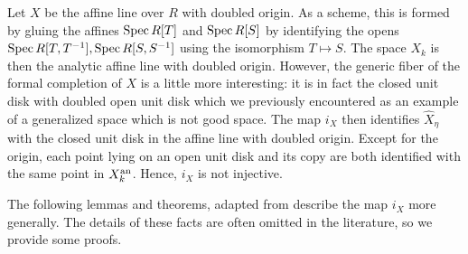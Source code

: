 \begin{example}
    Let $X$ be the affine line over $R$ with doubled origin. 
    As a scheme, this is formed by gluing the affines $\operatorname{Spec} R[T]$ and $\operatorname{Spec} R[S]$ by identifying the opens $\operatorname{Spec} R[T, T^{-1}], \operatorname{Spec} R[S, S^{-1}]$ using the isomorphism $T \mapsto S$. The space $X_k$ is then the analytic affine line with doubled origin. 
    However, the generic fiber of the formal completion of $X$ is a little more interesting: it is in fact the closed unit disk with doubled open unit disk which we previously encountered as an example of a generalized space which is not good space.
    The map $i_X$ then identifies $\hat{X}_{\eta}$ with the closed unit disk in the affine line with doubled origin.
    Except for the origin, each point lying on an open unit disk and its copy are both identified with the same point in $X^{\text{an}}_k$.
    Hence, $i_X$ is not injective.
\end{example}

The following lemmas and theorems, adapted from \parencite[Exercise 5.2.3.1]{temk} describe the map $i_X$ more generally. 
The details of these facts are often omitted in the literature, so we provide some proofs.

